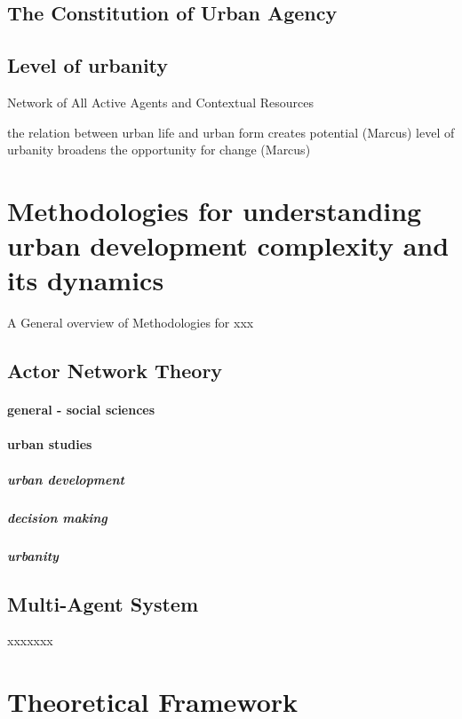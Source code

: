 \documentclass[11pt]{report}
\begin{document}
\subsection{The Constitution of Urban Agency}


\subsection{Level of urbanity}

Network of All Active Agents and Contextual Resources

the relation between urban life and urban form creates potential (Marcus)
level of urbanity broadens the opportunity for change (Marcus)

\section{Methodologies for understanding urban development complexity and its dynamics}

A General overview of Methodologies for xxx

\subsection{Actor Network Theory}

\paragraph{general - social sciences}

\paragraph{urban studies}

\subparagraph{urban development}

\subparagraph{decision making}

\subparagraph{urbanity}


\subsection{Multi-Agent System}

xxxxxxx

\section{Theoretical Framework}


\end{document}
